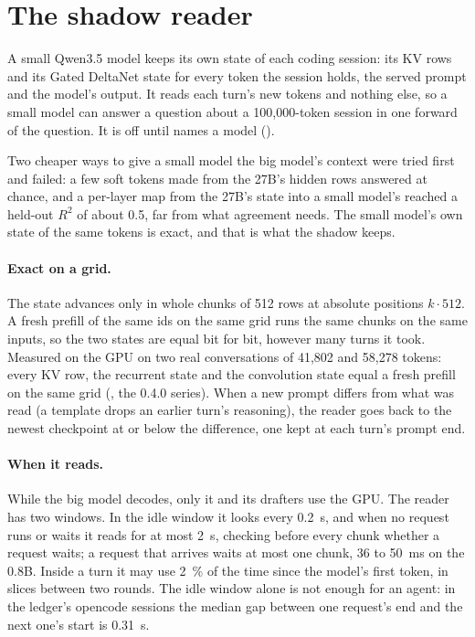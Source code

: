\section{The shadow reader}\label{sec:shadow}

A small Qwen3.5 model keeps its own state of each coding session: its KV rows and its Gated DeltaNet state for every token the session holds, the served prompt and the model's output. It reads each turn's new tokens and nothing else, so a small model can answer a question about a 100,000-token session in one forward of the question. It is off until  names a model ().

Two cheaper ways to give a small model the big model's context were tried first and failed: a few soft tokens made from the 27B's hidden rows answered at chance, and a per-layer map from the 27B's state into a small model's reached a held-out $R^2$ of about 0.5, far from what agreement needs. The small model's own state of the same tokens is exact, and that is what the shadow keeps.

\paragraph{Exact on a grid.} The state advances only in whole chunks of 512 rows at absolute positions $k \cdot 512$. A fresh prefill of the same ids on the same grid runs the same chunks on the same inputs, so the two states are equal bit for bit, however many turns it took. Measured on the GPU on two real conversations of 41,802 and 58,278 tokens: every KV row, the recurrent state and the convolution state equal a fresh prefill on the same grid (\measured, the 0.4.0 series). When a new prompt differs from what was read (a template drops an earlier turn's reasoning), the reader goes back to the newest checkpoint at or below the difference, one kept at each turn's prompt end.

\paragraph{When it reads.} While the big model decodes, only it and its drafters use the GPU. The reader has two windows. In the idle window it looks every 0.2~s, and when no request runs or waits it reads for at most 2~s, checking before every chunk whether a request waits; a request that arrives waits at most one chunk, 36 to 50~ms on the 0.8B. Inside a turn it may use 2~\% of the time since the model's first token, in slices between two rounds. The idle window alone is not enough for an agent: in the ledger's opencode sessions the median gap between one request's end and the next one's start is 0.31~s.

